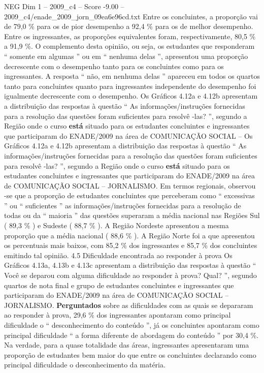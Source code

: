 \begin{textsample}{NEG Dim 1 – 2009\_c4 – Score -9.00 – 2009\_c4/enade\_2009\_jorn\_09ea6e96cd.txt}
Entre os concluintes, a proporção vai de 79,0 \% para os de pior desempenho a 92,4 \% para os de melhor desempenho.
Entre os ingressantes, as proporções equivalentes foram, respectivamente, 80,5 \% a 91,9 \%.
O complemento desta opinião, ou seja, os estudantes que responderam “ somente em algumas ” ou em “ nenhuma delas ”, apresentou uma proporção decrescente com o desempenho tanto para os concluintes como para os ingressantes.
A resposta “ não, em nenhuma delas ” apareceu em todos os quartos tanto para concluintes quanto para ingressantes independente do desempenho foi igualmente decrescente com o desempenho.
Os Gráficos 4.12a e 4.12b apresentam a distribuição das respostas à questão “ As informações/instruções fornecidas para a resolução das questões foram suficientes para resolvê -las? ”, segundo a Região onde o curso \textbf{está} situado para os estudantes concluintes e ingressantes que participaram do ENADE/2009 na área de COMUNICAÇÃO SOCIAL – Os Gráficos 4.12a e 4.12b apresentam a distribuição das respostas à questão “ As informações/instruções fornecidas para a resolução das questões foram suficientes para resolvê -las? ”, segundo a Região onde o curso \textbf{está} situado para os estudantes concluintes e ingressantes que participaram do ENADE/2009 na área de COMUNICAÇÃO SOCIAL – JORNALISMO.
Em termos regionais, observou -se que a proporção de estudantes concluintes que perceberam como “ excessivas ” ou “ suficientes ” as informações/instruções fornecidas para a resolução de todas ou da “ maioria ” das questões superaram a média nacional nas Regiões Sul ( 89,3 \% ) e Sudeste ( 88,7 \% ).
A Região Nordeste apresentou a mesma proporção que a média nacional ( 88,6 \% ).
A Região Norte foi a que apresentou os percentuais mais baixos, com 85,2 \% dos ingressantes e 85,7 \% dos concluintes emitindo tal opinião. 4.5 Dificuldade encontrada ao responder à prova Os Gráficos 4.13a, 4.13b e 4.13c apresentam a distribuição das respostas à questão “ Você se deparou com alguma dificuldade ao responder à prova?
Qual? ”, segundo quartos de nota final e grupo de estudantes concluintes e ingressantes que participaram do ENADE/2009 na área de COMUNICAÇÃO SOCIAL – JORNALISMO. \textbf{Perguntados} sobre as dificuldades com as quais se depararam ao responder à prova, 29,6 \% dos ingressantes apontaram como principal dificuldade o “ desconhecimento do conteúdo ”, já os concluintes apontaram como principal dificuldade “ a forma diferente de abordagem do conteúdo ” por 30,4 \%.
Na verdade, para a quase totalidade das áreas, ingressantes apresentaram uma proporção de estudantes bem maior do que entre os concluintes declarando como principal dificuldade o desconhecimento da matéria.

\end{textsample}
